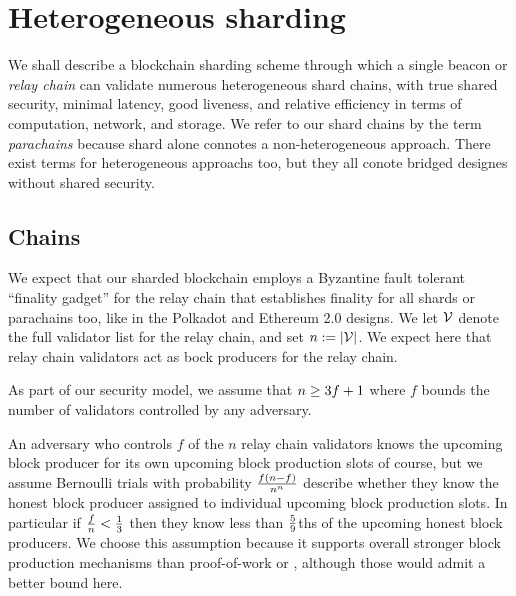 \section{Heterogeneous sharding}

We shall describe a blockchain sharding scheme through which a single beacon or {\em relay chain} can validate numerous heterogeneous shard chains, with true shared security, minimal latency, good liveness, and relative efficiency in terms of computation, network, and storage.  We refer to our shard chains by the term {\em parachains} because shard alone connotes a non-heterogeneous approach.  There exist terms for heterogeneous approachs too, but they all conote bridged designes without shared security.  

\subsection{Chains}

We expect that our sharded blockchain employs a Byzantine fault tolerant ``finality gadget'' for the relay chain that establishes finality for all shards or parachains too, like in the Polkadot and Ethereum 2.0 designs.  We let $\mathcal{V}$ denote the full validator list for the relay chain, and set $n := |\mathcal{V}|$.  We expect here that relay chain validators act as bock producers for the relay chain.  

As part of our security model, we assume that $n \ge 3 f + 1$ where $f$ bounds the number of validators controlled by any adversary.

An adversary who controls $f$ of the $n$ relay chain validators knows the upcoming block producer for its own upcoming block production slots of course, but we assume Bernoulli trials with probability ${f (n-f) \over n^n}$ describe whether they know the honest block producer assigned to individual upcoming block production slots.  In particular if ${f \over n} < {1\over3}$ then they know less than ${5 \over 9}$ths of the upcoming honest block producers.
We choose this assumption because it supports overall stronger block production mechanisms than proof-of-work or \cite{Praos}, although those would admit a better bound here.

